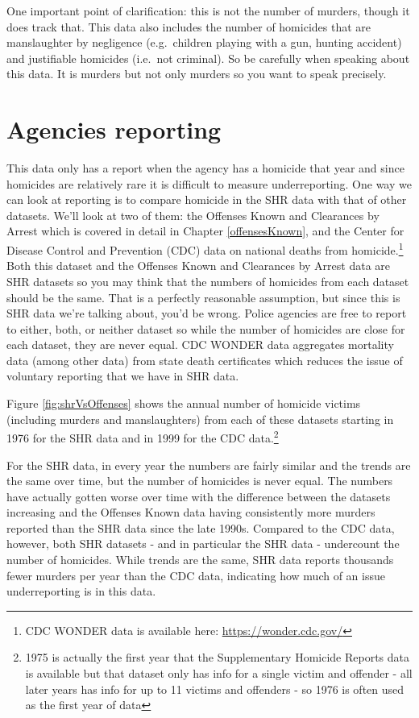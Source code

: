 \documentclass[
  12pt,
  openany]{book}
\begin{document}
One important point of clarification: this is not the number of murders, though it does track that. This data also includes the number of homicides that are manslaughter by negligence (e.g.~children playing with a gun, hunting accident) and justifiable homicides (i.e.~not criminal). So be carefully when speaking about this data. It is murders but not only murders so you want to speak precisely.

\section{Agencies reporting}\label{agencies-reporting-2}

This data only has a report when the agency has a homicide that year and since homicides are relatively rare it is difficult to measure underreporting. One way we can look at reporting is to compare homicide in the SHR data with that of other datasets. We'll look at two of them: the Offenses Known and Clearances by Arrest which is covered in detail in Chapter \ref{offensesKnown}, and the Center for Disease Control and Prevention (CDC) data on national deaths from homicide.\footnote{CDC WONDER data is available here: \url{https://wonder.cdc.gov/}} Both this dataset and the Offenses Known and Clearances by Arrest data are SHR datasets so you may think that the numbers of homicides from each dataset should be the same. That is a perfectly reasonable assumption, but since this is SHR data we're talking about, you'd be wrong. Police agencies are free to report to either, both, or neither dataset so while the number of homicides are close for each dataset, they are never equal. CDC WONDER data aggregates mortality data (among other data) from state death certificates which reduces the issue of voluntary reporting that we have in SHR data.

Figure \ref{fig:shrVsOffenses} shows the annual number of homicide victims (including murders and manslaughters) from each of these datasets starting in 1976 for the SHR data and in 1999 for the CDC data.\footnote{1975 is actually the first year that the Supplementary Homicide Reports data is available but that dataset only has info for a single victim and offender - all later years has info for up to 11 victims and offenders - so 1976 is often used as the first year of data}

For the SHR data, in every year the numbers are fairly similar and the trends are the same over time, but the number of homicides is never equal. The numbers have actually gotten worse over time with the difference between the datasets increasing and the Offenses Known data having consistently more murders reported than the SHR data since the late 1990s. Compared to the CDC data, however, both SHR datasets - and in particular the SHR data - undercount the number of homicides. While trends are the same, SHR data reports thousands fewer murders per year than the CDC data, indicating how much of an issue underreporting is in this data.
\end{document}
